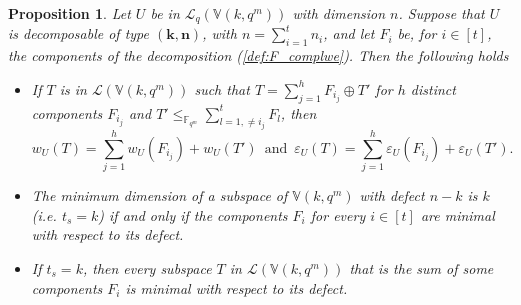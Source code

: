 \documentclass[11pt]{amsart}
\newtheorem{proposition}[theorem]{Proposition}
\newcommand{\fqm}{\mathbb{F}_{q^m}}
\begin{document}
\begin{proposition} \label{prop:decomposable}
 Let $U$ be in $\mathcal{L}_q(\mathbb{V}(k,q^m))$ with dimension $n$. Suppose that $U$ is decomposable of type $(\mathbf{k}, \mathbf{n})$, with $n=\sum_{i=1}^t n_i$, and let $F_i$ be, for $i\in[t]$, the components of the decomposition  (\ref{def:F_complwe}). Then the  following holds
 \begin{itemize}
    
     \item[1.] If $T$ is in $\mathcal{L}(\mathbb{V}(k,q^m))$ such that $T=\sum_{j=1}^{h}F_{i_j}\oplus T'$ for $h$ distinct components $F_{i_j}$ and $T'\leq_{\fqm} \sum_{l=1,\neq i_j}^{t}F_l$, then 
     \[w_U(T)=\sum_{j=1}^{h}w_U(F_{i_j})+w_U(T') \,\,\, \text{and} \,\,\, \varepsilon_U(T)=\sum_{j=1}^{h}\varepsilon_U(F_{i_j})+\varepsilon_U(T').\,\,\, \]
     \item[2.]  The minimum dimension of a subspace of $\mathbb{V}(k,q^m)$ with defect $n-k$ is $k$ (i.e. $t_s=k$) if and only if the components $F_i$ for every $i\in [t]$ are minimal with respect to its defect.
     \item[3.]  If $t_s=k$, then every subspace $T$ in $\mathcal{L}(\mathbb{V}(k,q^m))$ that is the sum of some components $F_i$  is minimal with respect to its defect.
 \end{itemize}
\end{proposition}
\end{document}
